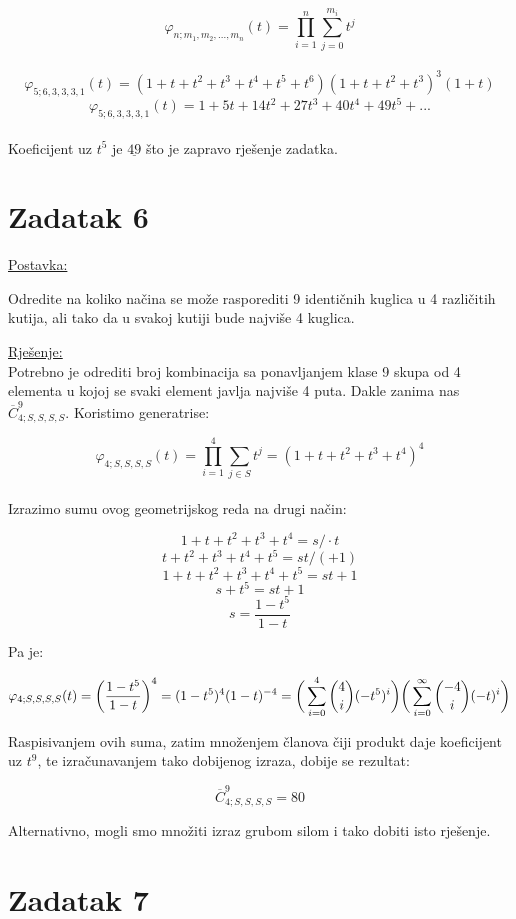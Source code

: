 \documentclass[12pt]{article}
\begin{document}
$$\varphi_{n; m_{1}, m_{2},..., m_{n}}(t) = \prod_{i=1}^{n} \sum_{j=0}^{m_{i}} t^j$$\\
$$\varphi_{5; 6,3,3,3,1}(t) = (1 + t + t^2 + t^3 + t^4 + t^5 + t^6)(1 + t + t^2 + t^3)^3(1 + t)$$
$$\varphi_{5; 6,3,3,3,1}(t) = 1 + 5t + 14t^2 + 27t^3 + 40t^4 + 49t^5 + ...$$\\

Koeficijent uz $t^5$ je $\underline{49}$ što je zapravo rješenje zadatka.
\newpage
\section*{Zadatak 6\label{Z6}}	 

\underline{Postavka:}

Odredite na koliko načina se može rasporediti 9 identičnih kuglica u 4 različitih kutija, ali tako da u svakoj kutiji bude najviše 4 kuglica.

\underline{Rješenje:}\\

Potrebno je odrediti broj kombinacija sa ponavljanjem klase 9 skupa od 4 elementa u kojoj se svaki element javlja najviše 4 puta. Dakle zanima nas $\overline{C}_{4; S,S,S,S}^{9}$. Koristimo generatrise:

$$\varphi_{4; S,S,S,S}(t) = \prod_{i=1}^4 \sum_{j \in S} t^j = (1 + t + t^2 + t^3 + t^4)^4$$\\

Izrazimo sumu ovog geometrijskog reda na drugi način:

$$1 + t + t^2 + t^3 + t^4 = s / \cdot t$$
$$t + t^2 + t^3 + t^4 + t^5 = st / (+1)$$
$$1 + t + t^2 + t^3 + t^4 + t^5 = st + 1 $$
$$s + t^5 = st + 1$$
$$s = \frac{1-t^5}{1-t}$$

Pa je:

$$\varphi_{4; S,S,S,S}(t) = \bigg(\frac{1-t^5}{1-t}\bigg)^4 = (1 - t^5)^4 (1 - t)^{-4} = \bigg(\sum_{i=0}^{4} \dbinom{4}{i} (-t^5)^i \bigg) \bigg(\sum_{i=0}^{\infty} \dbinom{-4}{i} (-t)^i \bigg)$$

Raspisivanjem ovih suma, zatim množenjem članova čiji produkt daje koeficijent uz $t^9$, te izračunavanjem tako dobijenog izraza, dobije se rezultat:

$$\overline{C}_{4; S,S,S,S}^{9} = 80$$

Alternativno, mogli smo množiti izraz grubom silom i tako dobiti isto rješenje.
\newpage
\section*{Zadatak 7\label{Z7}}	 
\end{document}

